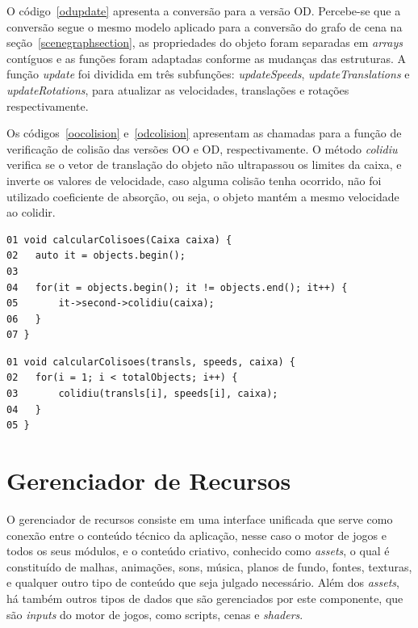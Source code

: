 O código~\ref{odupdate} apresenta a conversão para a versão OD. Percebe-se que a 
conversão segue o mesmo modelo aplicado para a conversão do grafo de cena na 
seção~\ref{scenegraphsection}, as propriedades do objeto foram separadas em 
\textit{arrays} contíguos e as funções foram adaptadas conforme as mudanças das 
estruturas. A função \textit{update} foi dividida em três subfunções: 
\textit{updateSpeeds}, \textit{updateTranslations} e \textit{updateRotations}, 
para atualizar as velocidades, translações e rotações respectivamente.

Os códigos~\ref{oocolision} e~\ref{odcolision} apresentam as chamadas para a função de 
verificação de colisão das versões OO e OD, respectivamente. O método \textit{colidiu} 
verifica se o vetor de translação do objeto não ultrapassou os limites da caixa, e 
inverte os valores de velocidade, caso alguma colisão tenha ocorrido, não foi utilizado 
coeficiente de absorção, ou seja, o objeto mantém a mesmo velocidade ao colidir.

\begin{lstlisting}[frame=single, caption={Chamada da verificação de colisão versão OO}, label=oocolision]
01 void calcularColisoes(Caixa caixa) {
02   auto it = objects.begin();
03
04   for(it = objects.begin(); it != objects.end(); it++) {
05       it->second->colidiu(caixa);
06   }
07 }
\end{lstlisting}

\begin{lstlisting}[frame=single, caption={Chamada da verificação de colisão versão OD}, label=odcolision]
01 void calcularColisoes(transls, speeds, caixa) {
02   for(i = 1; i < totalObjects; i++) {
03       colidiu(transls[i], speeds[i], caixa);
04   }
05 }
\end{lstlisting}

\section{Gerenciador de Recursos}

O gerenciador de recursos consiste em uma interface unificada que serve como conexão 
entre o conteúdo técnico da aplicação, nesse caso o motor de jogos e todos os seus 
módulos, e o conteúdo criativo, conhecido como \textit{assets}, o qual é constituído 
de malhas, animações, sons, música, planos de fundo, fontes, texturas, e qualquer outro 
tipo de conteúdo que seja julgado necessário. Além dos \textit{assets}, há também 
outros tipos de dados que são gerenciados por este componente, que são \textit{inputs} 
do motor de jogos, como scripts, cenas e \textit{shaders}.

